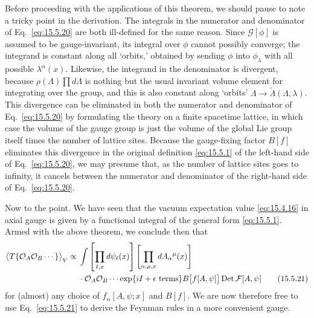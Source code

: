 Before proceeding with the applications of this theorem, we should pause to
note a tricky point in the derivation. The integrals in the numerator and
denominator of Eq.~\eqref{eq:15.5.20} are both ill-defined for the same reason.
Since $\mathcal G[\phi]$ is assumed to be gauge-invariant, its integral over
$\phi$ cannot possibly converge; the integrand is constant along all `orbits,'
obtained by sending $\phi$ into $\phi_\lambda$ with all possible
$\lambda^\alpha(x)$. Likewise, the integrand in the denominator is divergent,
because $\rho(\Lambda)\prod d\Lambda$ is nothing but the usual invariant
volume element for integrating over the group, and this is also constant along
`orbits' $\Lambda\longrightarrow\widetilde\Lambda(\Lambda,\lambda)$. This
divergence can be eliminated in both the numerator and denominator of
Eq.~\eqref{eq:15.5.20} by formulating the theory on a finite spacetime lattice,
in which case the volume of the gauge group is just the volume of the global
Lie group itself times the number of lattice sites. Because the gauge-fixing
factor $B[f]$ eliminates this divergence in the original definition
\eqref{eq:15.5.1} of the left-hand side of Eq.~\eqref{eq:15.5.20}, we may
presume that, as the number of lattice sites goes to infinity, it cancels
between the numerator and denominator of the right-hand side of
Eq.~\eqref{eq:15.5.20}.

Now to the point. We have seen that the vacuum expectation value
\eqref{eq:15.4.16} in axial gauge is given by a functional integral of the
general form \eqref{eq:15.5.1}. Armed with the above theorem, we conclude then
that
\begin{align}
  \bigl\langle T\{\mathcal O_A\mathcal O_B\cdots\}\bigr\rangle_V
  \propto{}&\int\left[\prod_{\ell,x}d\psi_\ell(x)\right]
  \left[\prod_{\alpha,\mu,x}dA_\alpha{}^\mu(x)\right]
  \notag\\
  &\cdot\mathcal O_A\mathcal O_B\cdots\exp\{iI+\epsilon\text{ terms}\}
  B\bigl[f[A,\psi]\bigr]\operatorname{Det}\mathcal F[A,\psi]
  \tag{15.5.21}\label{eq:15.5.21}
\end{align}
for (almost) any choice of $f_\alpha[A,\psi;x]$ and $B[f]$. We are now
therefore free to use Eq.~\eqref{eq:15.5.21} to derive the Feynman rules in a
more convenient gauge.

